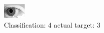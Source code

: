 \begin{figure}[h!]
\begin{center}
\includegraphics[width=0.60\columnwidth]{figures/ID195_class_4_target_3.png}
\end{center}
\caption{ Classification: 4 actual target: 3}
\label{fig:ID195_class_4_target_3}
\end{figure}
